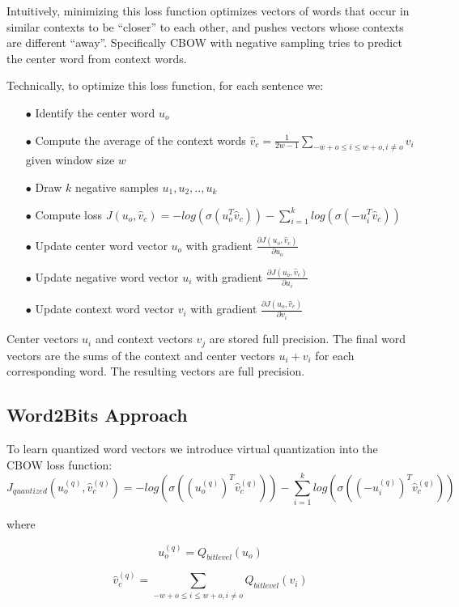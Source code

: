 \documentclass{article} %
\begin{document}
Intuitively, minimizing this loss function optimizes vectors of
words that occur in similar contexts to be ``closer'' to each other,
and pushes vectors whose contexts are different ``away''. Specifically CBOW with negative sampling tries to predict the
center word from context words.

Technically, to optimize this loss function, for each sentence we:

\begin{enumerate}

\item[$\bullet$] Identify the center word $u_o$
\item[$\bullet$] Compute the average of the context words $\hat{v}_c = \frac{1}{2w-1} \sum_{-w+o \leq i \leq w+o, i \neq o} v_i$ given window size $w$
\item[$\bullet$] Draw $k$ negative samples $u_1, u_2, .., u_k$
\item[$\bullet$] Compute loss $J(u_o, \hat{v}_c) = -log(\sigma(u_o^T\hat{v}_c)) - \sum_{i=1}^{k} log(\sigma(-u_i^T\hat{v}_c))$
\item[$\bullet$] Update center word vector $u_o$ with gradient $\frac{\partial J(u_o, \hat{v}_c)}{\partial u_o}$
\item[$\bullet$] Update negative word vector $u_i$ with gradient $\frac{\partial J(u_o, \hat{v}_c)}{\partial u_i}$
\item[$\bullet$] Update context word vector $v_i$ with gradient $\frac{\partial J(u_o, \hat{v}_c)}{\partial v_i}$
\end{enumerate}

Center vectors $u_i$ and context vectors $v_j$ are stored full
precision. The final word vectors are the sums of the context and
center vectors $u_i + v_i$ for each corresponding word. The resulting
vectors are full precision.

\subsection{Word2Bits Approach}
To learn quantized word vectors we introduce virtual quantization into the CBOW loss function:
$$
J_{quantized}(u^{(q)}_o, \hat{v}^{(q)}_c) = -log(\sigma((u^{(q)}_{o})^{T} \hat{v}^{(q)}_c)) - \sum_{i=1}^{k} log(\sigma((-u^{(q)}_i)^T\hat{v}^{(q)}_c))
$$

where

$$
u^{(q)}_o = Q_{bitlevel}(u_o)
$$

$$
\hat{v}^{(q)}_c = \sum_{-w+o \leq i \leq w+o,i \neq o} Q_{bitlevel}(v_i)
$$
\end{document}

